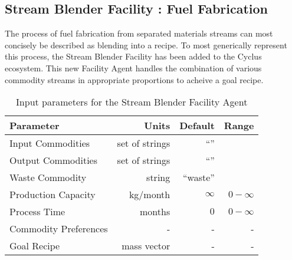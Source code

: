 \subsection{Stream Blender Facility : Fuel Fabrication}

The process of fuel fabrication from separated materials streams can most
concisely be described as blending into a recipe. To most generically represent
this process, the Stream Blender Facility has been added to the Cyclus 
ecosystem.  This new Facility Agent handles the combination of various 
commodity streams in appropriate proportions to acheive a goal recipe.  

\begin{table}[h!]
\centering
\begin{tabular}{|l|r|r|r|}
\hline
\textbf{Parameter} & \textbf{Units} & \textbf{Default} & \textbf{Range}\\
\hline
Input Commodities & set of strings& ``''& \\
Output Commodities & set of strings&``'' & \\
Waste Commodity & string & ``waste'' & \\
Production Capacity& kg/month& $\infty$& $0-\infty$\\
Process Time& months & $0$ & $0-\infty$ \\
Commodity Preferences& - & - & - \\
Goal Recipe& mass vector & - & -  \\
\hline
\end{tabular}
\caption{Input parameters for the Stream Blender Facility Agent}
\label{tab:commodconverter}
\end{table}
